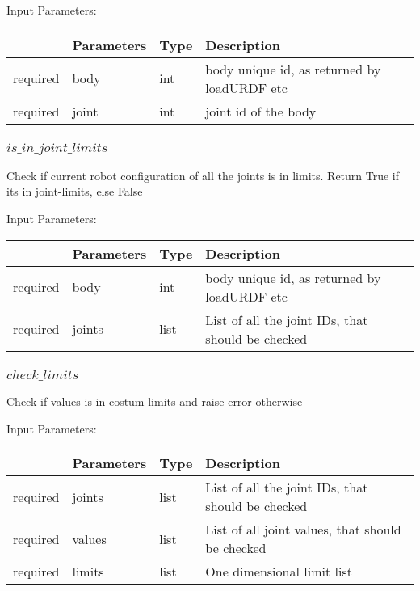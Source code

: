 \documentclass[
	ngerman,
	accentcolor=9c,%
	type=intern,
	marginpar=false
	]{tudapub}
\begin{document}
\vspace{0.5cm}
\noindent Input Parameters:
\vspace{0.5cm}

\begin{tabular}{|p{}|p{}|p{}| p{}|}
\hline
 & \textbf{Parameters} & \textbf{Type} & \textbf{Description} \\
\hline
required & body & int & body unique id, as returned by loadURDF etc\\
\hline
required & joint &  int & joint id of the body \\
\hline

\end{tabular}
\vspace{0.5cm}


\subsubsection{$is\_in\_joint\_limits$}
\noindent  Check if current robot configuration of all the joints is in limits.  Return True if its in joint-limits, else False

\vspace{0.5cm}
\noindent Input Parameters:
\vspace{0.5cm}

\begin{tabular}{|p{}|p{}|p{}| p{}|}
\hline
 & \textbf{Parameters} & \textbf{Type} & \textbf{Description} \\
\hline
required & body & int & body unique id, as returned by loadURDF etc\\
\hline
required & joints &  list & List of all the joint IDs, that should be checked \\
\hline

\end{tabular}
\vspace{0.5cm}




\subsubsection{$check\_limits$}
\noindent  Check if values is in costum limits and raise error otherwise

\vspace{0.5cm}
\noindent Input Parameters:
\vspace{0.5cm}

\begin{tabular}{|p{}|p{}|p{}| p{}|}
\hline
 & \textbf{Parameters} & \textbf{Type} & \textbf{Description} \\
\hline
required & joints &  list & List of all the joint IDs, that should be checked \\
\hline
required & values &  list & List of all joint values, that should be checked \\
\hline
required & limits &  list & One dimensional limit list \\
\hline
\end{tabular}
\vspace{0.5cm}
\end{document}
